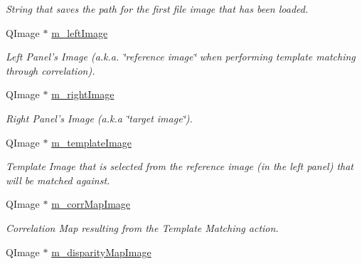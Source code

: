 \begin{CompactItemize}
\begin{CompactList}\small\item\em String that saves the path for the first file image that has been loaded. \item\end{CompactList}\item 
\hypertarget{classQcorr_e8bdd4be8a0c3023be34a1301b28c913}{
QImage $\ast$ \hyperlink{classQcorr_e8bdd4be8a0c3023be34a1301b28c913}{m\_\-leftImage}}
\label{classQcorr_e8bdd4be8a0c3023be34a1301b28c913}

\begin{CompactList}\small\item\em Left Panel's Image (a.k.a. \char`\"{}reference image\char`\"{} when performing template matching through correlation). \item\end{CompactList}\item 
\hypertarget{classQcorr_ae1695d731f191c694186e00b96f469e}{
QImage $\ast$ \hyperlink{classQcorr_ae1695d731f191c694186e00b96f469e}{m\_\-rightImage}}
\label{classQcorr_ae1695d731f191c694186e00b96f469e}

\begin{CompactList}\small\item\em Right Panel's Image (a.k.a \char`\"{}target image\char`\"{}). \item\end{CompactList}\item 
\hypertarget{classQcorr_5594d939890f10991da0009e4c32bea3}{
QImage $\ast$ \hyperlink{classQcorr_5594d939890f10991da0009e4c32bea3}{m\_\-templateImage}}
\label{classQcorr_5594d939890f10991da0009e4c32bea3}

\begin{CompactList}\small\item\em Template Image that is selected from the reference image (in the left panel) that will be matched against. \item\end{CompactList}\item 
\hypertarget{classQcorr_c7dc2785613864bea2d8bb0b5f009f36}{
QImage $\ast$ \hyperlink{classQcorr_c7dc2785613864bea2d8bb0b5f009f36}{m\_\-corrMapImage}}
\label{classQcorr_c7dc2785613864bea2d8bb0b5f009f36}

\begin{CompactList}\small\item\em Correlation Map resulting from the Template Matching action. \item\end{CompactList}\item 
\hypertarget{classQcorr_731915641051962d6a03a31b772640d4}{
QImage $\ast$ \hyperlink{classQcorr_731915641051962d6a03a31b772640d4}{m\_\-disparityMapImage}}
\label{classQcorr_731915641051962d6a03a31b772640d4}


\end{CompactItemize}
